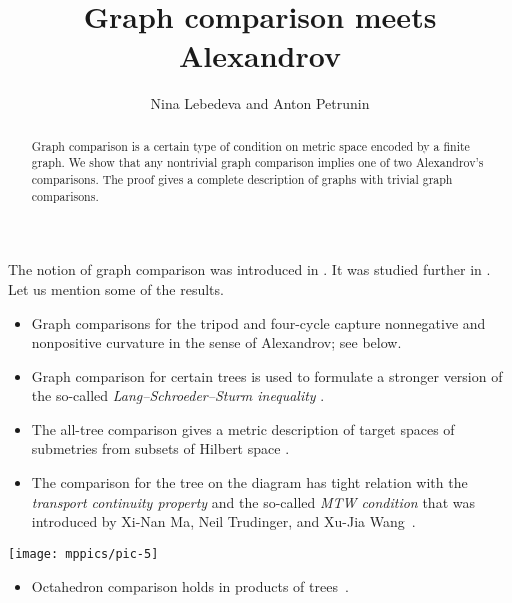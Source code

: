 \documentclass{article}
\def\thetitle{Graph comparison meets Alexandrov}
\def\theauthors{Nina Lebedeva and Anton Petrunin}
\begin{document}


\title{\thetitle}
\author{\theauthors}

\date{}
\maketitle
\begin{abstract}
Graph comparison is a certain type of condition on metric space encoded by a finite graph.
We show that any nontrivial graph comparison implies one of two Alexandrov's comparisons.
The proof gives a complete description of graphs with trivial graph comparisons.
\end{abstract}

The notion of graph comparison was introduced in \cite{lebedeva-petrunin-zolotov}.
It was studied further in \cite{toyoda,toyoda2019,lebedeva-petrunin-CBB,lebedeva,lebedeva-petrunin,lebedeva-petrunin-octahedron}.
Let us mention some of the results.
\begin{itemize}
\item Graph comparisons for the tripod and four-cycle capture nonnegative and nonpositive curvature in the sense of Alexandrov; see below.
\end{itemize}
\begin{itemize}
\item Graph comparison for certain trees is used to formulate a stronger version of the so-called \emph{Lang--Schroeder--Sturm inequality} \cite{lang-schroeder, sturm, lebedeva-petrunin-CBB}.
\end{itemize}
\begin{itemize}
\item The all-tree comparison gives a metric description of target spaces of submetries from subsets of Hilbert space \cite{lebedeva-petrunin-zolotov}.
\end{itemize}

\noindent
\begin{minipage}
{.80\textwidth}
\begin{itemize}
\item The comparison for the tree on the diagram has tight relation with the \emph{transport continuity property} and the so-called \emph{MTW condition} that was introduced by Xi-Nan Ma, Neil Trudinger, and Xu-Jia Wang~\cite{lebedeva-petrunin-zolotov,ma-trudinger-wang}.
\end{itemize}
\end{minipage}
\hfill
\begin{minipage}{.17\textwidth}
\centering
\vskip-1mm
\texttt{[image: mppics/pic-5]}
\end{minipage}
\begin{itemize}
\item Octahedron comparison holds in products of trees~\cite{lebedeva-petrunin-octahedron}.
\end{itemize}
\end{document}

